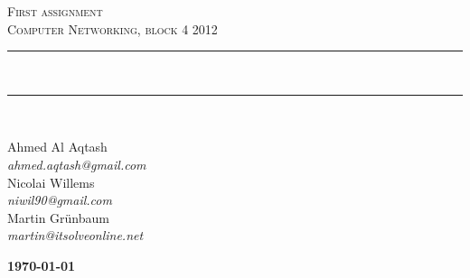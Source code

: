 \documentclass[10pt]{article}
\newcommand{\HRule}{\rule{\linewidth}{0.5mm}}
\begin{document}
\begin{titlepage}

\begin{center}



\textsc{\LARGE First assignment}\\[1.5cm]

\textsc{\Large Computer Networking, block 4 2012}\\[0.5cm]


\HRule \\[0.4cm]



\HRule \\ [7.5cm]


\begin{minipage}{0.5\textwidth}
\begin{flushleft} \large
Ahmed Al Aqtash \\
\textit{ahmed.aqtash@gmail.com}\\
Nicolai Willems \\
\textit{niwil90@gmail.com}\\
Martin Grünbaum \\
\textit{martin@itsolveonline.net}\\
\end{flushleft}
\end{minipage}
\begin{minipage}{0.4\textwidth}
\begin{flushright} \large
\textbf{\today} \\
\end{flushright}
\end{minipage}

\vfill



\end{center}

\end{titlepage}
\newpage
\tableofcontents
\newpage



\end{document}

